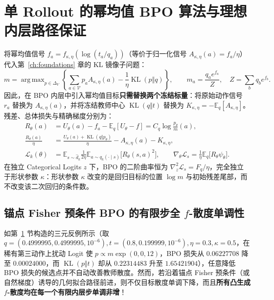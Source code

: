 \documentclass[lang=cn,scheme=chinese,openany]{elegantbook}
\newcommand{\E}{\mathbb E}
\newcommand{\KL}{\operatorname{KL}}
\DeclareMathOperator*{\argmax}{arg\,max}
\begin{document}
\section{单 Rollout 的幂均值 BPO 算法与理想内层路径保证}
\label{sec:power-bpo-algorithm}

将幂均值信号 $f_a=f_{\kappa,\eta}(\log(t_a/q_a))$（等价于归一化信号 $A_{\kappa,\eta}(a)=f_a/\eta$）代入第~\ref{ch:foundations} 章的 KL 镜像子问题：
\begin{equation}
 m=\argmax_{p\in\Delta_V}
 \left\{\sum_{a\in\mathcal V} p_a A_{\kappa,\eta}(a)
       -\frac1\eta\KL(p\Vert q)\right\},
 \qquad m_a=\frac{q_a e^{f_a}}{Z},\quad Z=\sum_b q_b e^{f_b}.
 \label{eq:power-bpo-mirror-subproblem,eq:power-bpo-explicit-target}
\end{equation}
因此，在 BPO 内层中引入幂均值目标\textbf{只需替换两个冻结标量}：将原始动作信号 $r_a$ 替换为 $A_{\kappa,\eta}(a)$，并将冻结教师中心 $\KL(q\Vert t)$ 替换为 $K_{\kappa,\eta}=-\E_q[A_{\kappa,\eta}]$。残差、总体损失与精确梯度分别为：
\begin{align}
 R_\theta(a)&=U_\theta(a)-f_a-\E_q[U_\theta-f]
            =C_q\log\frac{p_\theta}{m}(a),\\
 \frac{R_\theta(a)}{\eta}
 &=\frac{U_\theta(a)+\KL(q\Vert p_\theta)}{\eta}-A_{\kappa,\eta}(a)-K_{\kappa,\eta},\\
 \mathcal L_k(\theta)
 &=\E_{s\sim\widehat d_k}\frac1{2\eta}
     \E_{a\sim q_k(\cdot\mid s)}\bigl[R_\theta(s,a)^2\bigr],\qquad
 \nabla_\theta\mathcal L_s=\frac1\eta\E_q\bigl[R_\theta\psi_\theta\bigr].
 \label{eq:power-bpo-population-loss,eq:power-bpo-gradient}
\end{align}
在独立 Categorical Logits $z$ 下，BPO 的二阶曲率恒为 $\nabla_z^2\mathcal L_s=F_q/\eta$，完全独立于形状参数 $\kappa$：形状参数 $\kappa$ 改变的是回归目标的位置 $\log m$ 与初始残差尾部，而不改变该二次回归的条件数。

\subsection{锚点 Fisher 预条件 BPO 的有限步全 \texorpdfstring{$f$}{f}-散度单调性}

如第~\ref{sec:power-bpo-algorithm} 节构造的三元反例所示（取 $q=(0.4999995,0.4999995,10^{-6}), t=(0.8,0.199999,10^{-6}), \eta=0.3, \kappa=0.5$，在稀有第三动作上扰动 Logit 使 $p\propto m\exp(0,0,12)$，BPO 损失从 $0.06227708$ 降至 $0.00024000$，而 $\KL(p\Vert t)$ 却从 $0.22314483$ 升至 $1.65421904$），任意降低 BPO 损失的候选点并不自动改善教师散度。然而，若沿着锚点 Fisher 预条件（或自然梯度）诱导的几何拟合路径前进，则不仅目标散度单调下降，而且\textbf{所有凸生成 $f$-散度均在每一个有限内层步单调非增}！
\end{document}
